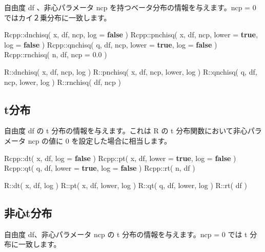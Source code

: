 \documentclass[]{book}
\newenvironment{Shaded}{\begin{snugshade}}{\end{snugshade}}
\newcommand{\FloatTok}[1]{\textcolor[rgb]{0.00,0.00,0.81}{#1}}
\newcommand{\KeywordTok}[1]{\textcolor[rgb]{0.13,0.29,0.53}{\textbf{#1}}}
\newcommand{\NormalTok}[1]{#1}
\begin{document}
自由度 df 、非心パラメータ ncp を持つベータ分布の情報を与えます。ncp = 0 ではカイ２乗分布に一致します。

\begin{Shaded}
\begin{Highlighting}[]
\NormalTok{Rcpp::dnchisq( x, df, ncp,               log = }\KeywordTok{false}\NormalTok{ )}
\NormalTok{Rcpp::pnchisq( x, df, ncp, lower = }\KeywordTok{true}\NormalTok{, log = }\KeywordTok{false}\NormalTok{ )}
\NormalTok{Rcpp::qnchisq( q, df, ncp, lower = }\KeywordTok{true}\NormalTok{, log = }\KeywordTok{false}\NormalTok{ )}
\NormalTok{Rcpp::rnchisq( n, df, ncp = }\FloatTok{0.0}\NormalTok{ )}

\NormalTok{R::dnchisq( x, df, ncp,        log )}
\NormalTok{R::pnchisq( x, df, ncp, lower, log )}
\NormalTok{R::qnchisq( q, df, ncp, lower, log )}
\NormalTok{R::rnchisq(    df, ncp )}
\end{Highlighting}
\end{Shaded}

\hypertarget{t}{%
\subsection{t分布}\label{t}}

自由度 df の t 分布の情報を与えます。これは R の t 分布関数において非心パラメータ ncp の値に 0 を設定した場合に相当します。

\begin{Shaded}
\begin{Highlighting}[]
\NormalTok{Rcpp::dt( x, df,               log = }\KeywordTok{false}\NormalTok{ )}
\NormalTok{Rcpp::pt( x, df, lower = }\KeywordTok{true}\NormalTok{, log = }\KeywordTok{false}\NormalTok{ )}
\NormalTok{Rcpp::qt( q, df, lower = }\KeywordTok{true}\NormalTok{, log = }\KeywordTok{false}\NormalTok{ )}
\NormalTok{Rcpp::rt( n, df )}

\NormalTok{R::dt( x, df,        log )}
\NormalTok{R::pt( x, df, lower, log )}
\NormalTok{R::qt( q, df, lower, log )}
\NormalTok{R::rt(    df )}
\end{Highlighting}
\end{Shaded}

\hypertarget{t}{%
\subsection{非心t分布}\label{t}}

自由度 df、非心パラメータ ncp の t 分布の情報を与えます。ncp = 0 では t 分布に一致します。
\end{document}
